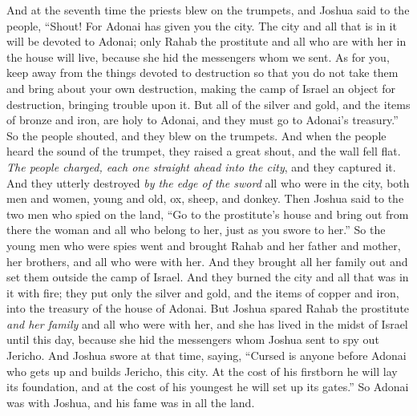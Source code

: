 \begin{biblechapter}
\verse And at the seventh time the priests blew on the trumpets, and Joshua said to the people, “Shout! For Adonai has given you the city.
\verse The city and all that is in it will be devoted to Adonai; only Rahab the prostitute and all who are with her in the house will live, because she hid the messengers whom we sent.
\verse As for you, keep away from the things devoted to destruction so that you do not take them and bring about your own destruction, making the camp of Israel an object for destruction, bringing trouble upon it.
\verse But all of the silver and gold, and the items of bronze and iron, are holy to Adonai, and they must go to Adonai’s treasury.”
\verse So the people shouted, and they blew on the trumpets. And when the people heard the sound of the trumpet, they raised a great shout, and the wall fell flat. \textit{The people charged, each one straight ahead into the city}, and they captured it.
\verse And they utterly destroyed \textit{by the edge of the sword} all who were in the city, both men and women, young and old, ox, sheep, and donkey.
\verse Then Joshua said to the two men who spied on the land, “Go to the prostitute’s house and bring out from there the woman and all who belong to her, just as you swore to her.”
\verse So the young men who were spies went and brought Rahab and her father and mother, her brothers, and all who were with her. And they brought all her family out and set them outside the camp of Israel.
\verse And they burned the city and all that was in it with fire; they put only the silver and gold, and the items of copper and iron, into the treasury of the house of Adonai.
\verse But Joshua spared Rahab the prostitute \textit{and her family} and all who were with her, and she has lived in the midst of Israel until this day, because she hid the messengers whom Joshua sent to spy out Jericho.
\verse And Joshua swore at that time, saying, “Cursed is anyone before Adonai who gets up and builds Jericho, this city. At the cost of his firstborn he will lay its foundation, and at the cost of his youngest he will set up its gates.”
\verse So Adonai was with Joshua, and his fame was in all the land.
\end{biblechapter}

